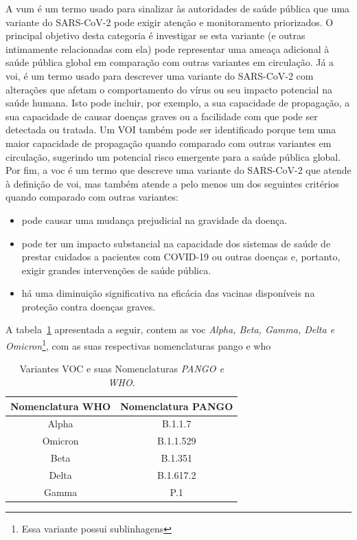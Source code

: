 A \gls{vum} é um termo usado para sinalizar às autoridades de saúde pública que uma variante do SARS-CoV-2 pode exigir atenção e monitoramento priorizados. O principal objetivo desta categoria é investigar se esta variante (e outras intimamente relacionadas com ela) pode representar uma ameaça adicional à saúde pública global em comparação com outras variantes em circulação.
Já a \gls{voi}, é um termo usado para descrever uma variante do SARS-CoV-2 com alterações que afetam o comportamento do vírus ou seu impacto potencial na saúde humana. Isto pode incluir, por exemplo, a sua capacidade de propagação, a sua capacidade de causar doenças graves ou a facilidade com que pode ser detectada ou tratada. Um VOI também pode ser identificado porque tem uma maior capacidade de propagação quando comparado com outras variantes em circulação, sugerindo um potencial risco emergente para a saúde pública global. Por fim, a \gls{voc} é um termo que descreve uma variante do SARS-CoV-2 que atende à definição de \gls{voi}, mas também atende a pelo menos um dos seguintes critérios quando comparado com outras variantes\cite{who_variants}:
\begin{itemize}
  \item pode causar uma mudança prejudicial na gravidade da doença.
  \item   pode ter um impacto substancial na capacidade dos sistemas de saúde de prestar cuidados a pacientes com COVID-19 ou outras doenças e, portanto, exigir grandes intervenções de saúde pública.
  \item há uma diminuição significativa na eficácia das vacinas disponíveis na proteção contra doenças graves.
\end{itemize}

A tabela~\ref{tab:nomenclaturaPangoWho} apresentada a seguir, contem as \gls{voc} \textit{Alpha, Beta, Gamma, Delta e Omicron}\footnote{Essa variante possui sublinhagens }, com as suas respectivas nomenclaturas \gls{pango} e \gls{who}

\begin{table}[htb]
  \caption{Variantes VOC e suas Nomenclaturas \textit{PANGO e WHO}.}
  \begin{center}
    \begin{tabular}{c|c}
      \hline
      Nomenclatura WHO & Nomenclatura PANGO \\
      \hline
      Alpha            & B.1.1.7            \\
      Omicron          & B.1.1.529          \\
      Beta             & B.1.351            \\
      Delta            & B.1.617.2          \\
      Gamma            & P.1                \\
      \hline
    \end{tabular}
  \end{center}
  \label{tab:nomenclaturaPangoWho}
\end{table}


